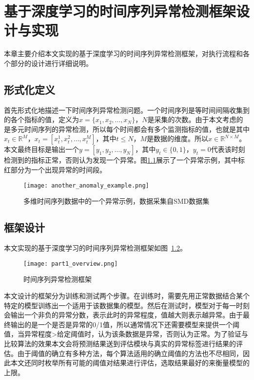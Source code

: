 
\chapter{基于深度学习的时间序列异常检测框架设计与实现}
\label{cha:anomaly:detection}
本章主要介绍本文实现的基于深度学习的时间序列异常检测框架，对执行流程和各个部分的设计进行详细说明。
\section{形式化定义}
首先形式化地描述一下时间序列异常检测问题。一个时间序列是等时间间隔收集到的各个指标的值，定义为$x=\{x_1,x_2,\dots,x_N\}$，$N$是采集的次数。由于本文考虑的是多元时间序列的异常检测，所以每个时间都会有多个监测指标的值，也就是其中$x_t\in \mathbb{R}^M$，$x_t=[x_t^1,x_t^2,\dots,x_t^M]$，其中$t\leq N$，$M$是数据的维度。所以$x\in \mathbb{R}^{N\times M}$。本文最终目标是输出一个$y=[y_1, y_2,\dots, y_N ]$，其中$y_t\in \{0,1\}$，$y_t=0$代表该时刻检测到的指标正常，否则认为发现一个异常。图\ref{fig:anomaly_example}展示了一个异常示例，其中标红部分为一个出现异常的时间段。
\begin{figure}[htbp]
  \centering
  \texttt{[image: another\_anomaly\_example.png]}
  \caption{多维时间序列数据中的一个异常示例，数据采集自SMD\cite{su2019robust}数据集}
  \label{fig:anomaly_example}
\end{figure} 

\section{框架设计}
本文实现的基于深度学习的时间序列异常检测框架如图~\ref{fig:part1_overview}。

\begin{figure}[htbp]
    \centering
    \texttt{[image: part1\_overview.png]}
    \caption{时间序列异常检测框架}
    \label{fig:part1_overview}
  \end{figure}

本文设计的框架分为训练和测试两个步骤。在训练时，需要先用正常数据结合某个特定的模型训练出一个适用于该数据集的模型。然后在测试时，模型对于每一时刻会输出一个非负的异常分数，表示此时的异常程度，值越大则表示越异常。由于最终输出的是一个是否是异常的0/1值，所以通常情况下还需要模型来提供一个阈值，当异常程度>给定阈值时，认为该条数据是异常，否则认为正常。为了验证与比较算法的效果本文会将预测结果送到评估模块与真实的异常标签进行结果的评估。由于阈值的确立有多种方法，每个算法适用的确立阈值的方法也不尽相同，因此本文还同时枚举所有可能的阈值对结果进行评估，选取结果最好的来衡量模型的上限\cite{xu2018unsupervised,su2019robust,DBLP:conf/ipccc/LiCP18,DBLP:conf/infocom/ChenXLPCQFW19}。


